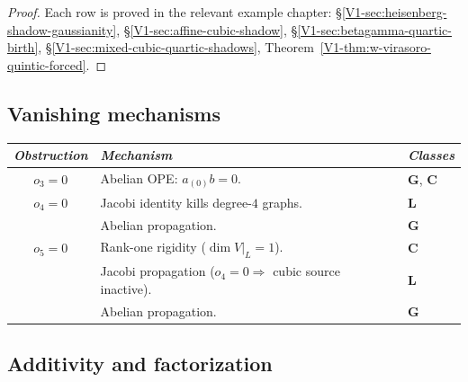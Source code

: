 \begin{proof}
Each row is proved in the relevant example chapter:
\S\ref{V1-sec:heisenberg-shadow-gaussianity},
\S\ref{V1-sec:affine-cubic-shadow},
\S\ref{V1-sec:betagamma-quartic-birth},
\S\ref{V1-sec:mixed-cubic-quartic-shadows},
Theorem~\ref{V1-thm:w-virasoro-quintic-forced}.
\end{proof}



\subsection{Vanishing mechanisms}

\begin{theorem}
\ClaimStatusProvedHere
{}
\begin{center}
\small
\renewcommand{\arraystretch}{1.25}
\begin{tabular}{cll}
\toprule
\emph{Obstruction} & \emph{Mechanism} & \emph{Classes} \\
\midrule
$o_3 = 0$ &
 Abelian OPE: $a_{(0)}b = 0$. &
 $\mathbf{G}$, $\mathbf{C}$ \\
$o_4 = 0$ &
 Jacobi identity kills degree-$4$ graphs. &
 $\mathbf{L}$ \\
 & Abelian propagation. &
 $\mathbf{G}$ \\
$o_5 = 0$ &
 Rank-one rigidity ($\dim V|_L = 1$). &
 $\mathbf{C}$ \\
 & Jacobi propagation ($o_4 = 0 \Rightarrow$
 cubic source inactive). &
 $\mathbf{L}$ \\
 & Abelian propagation. &
 $\mathbf{G}$ \\
\bottomrule
\end{tabular}
\end{center}
\end{theorem}



\subsection{Additivity and factorization}

